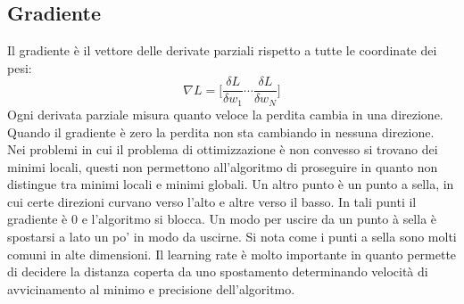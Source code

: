 	\subsection{Gradiente}
	Il gradiente \`e il vettore delle derivate parziali rispetto a tutte le coordinate dei pesi:
	$$\nabla L = \biggl[\dfrac{\delta L}{\delta w_1}\cdots\dfrac{\delta L}{\delta w_N}\biggr]$$
	Ogni derivata parziale misura quanto veloce la perdita cambia in una direzione.
	Quando il gradiente \`e zero la perdita non sta cambiando in nessuna direzione.\\
	
	Nei problemi in cui il problema di ottimizzazione \`e non convesso si trovano dei minimi locali, questi non permettono all'algoritmo di proseguire in quanto non distingue tra minimi locali e minimi globali.
	Un altro punto \`e un punto a sella, in cui certe direzioni curvano verso l'alto e altre verso il basso.
	In tali punti il gradiente \`e $0$ e l'algoritmo si blocca.
	Un modo per uscire da un punto \`a sella \`e spostarsi a lato un po' in modo da uscirne.
	Si nota come i punti a sella sono molti comuni in alte dimensioni.
	Il learning rate \`e molto importante in quanto permette di decidere la distanza coperta da uno spostamento determinando velocit\`a di avvicinamento al minimo e precisione dell'algoritmo.
